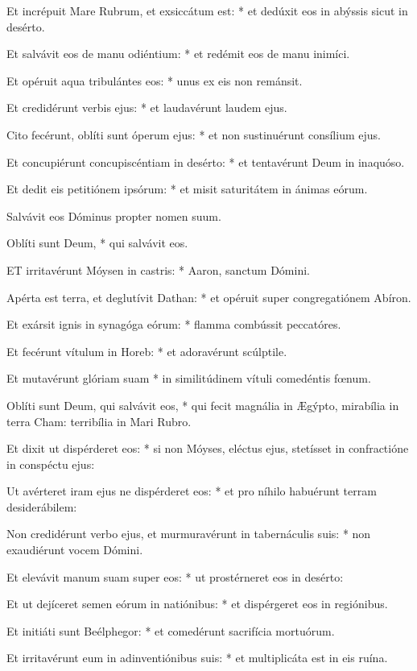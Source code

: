 Et incrépuit Mare Rubrum, et exsiccátum est: * et dedúxit eos in abýssis sicut in desérto.

Et salvávit eos de manu odiéntium: * et redémit eos de manu inimíci.

Et opéruit aqua tribulántes eos: * unus ex eis non remánsit.

Et credidérunt verbis ejus: * et laudavérunt laudem ejus.

Cito fecérunt, oblíti sunt óperum ejus: * et non sustinuérunt consílium ejus.

Et concupiérunt concupiscéntiam in desérto: * et tentavérunt Deum in inaquóso.

Et dedit eis petitiónem ipsórum: * et misit saturitátem in ánimas eórum.

 Salvávit eos Dóminus propter nomen suum.

 Oblíti sunt Deum, * qui salvávit eos.


\lettrine[lines=2]{E}{T} irritavérunt Móysen in castris: * Aaron, sanctum Dómini.

Apérta est terra, et deglutívit Dathan: * et opéruit super congregatiónem Abíron.

Et exársit ignis in synagóga eórum: * flamma combússit peccatóres.

Et fecérunt vítulum in Horeb: * et adoravérunt scúlptile.

Et mutavérunt glóriam suam * in similitúdinem vítuli comedéntis fœnum.

Oblíti sunt Deum, qui salvávit eos, * qui fecit magnália in Ægýpto, mirabília in terra Cham: terribília in Mari Rubro.

Et dixit ut dispérderet eos: * si non Móyses, eléctus ejus, stetísset in confractióne in conspéctu ejus:

Ut avérteret iram ejus ne dispérderet eos: * et pro níhilo habuérunt terram desiderábilem:

Non credidérunt verbo ejus, et murmuravérunt in tabernáculis suis: * non exaudiérunt vocem Dómini.

Et elevávit manum suam super eos: * ut prostérneret eos in desérto:

Et ut dejíceret semen eórum in natiónibus: * et dispérgeret eos in regiónibus.

Et initiáti sunt Beélphegor: * et comedérunt sacrifícia mortuórum.

Et irritavérunt eum in adinventiónibus suis: * et multiplicáta est in eis ruína.

